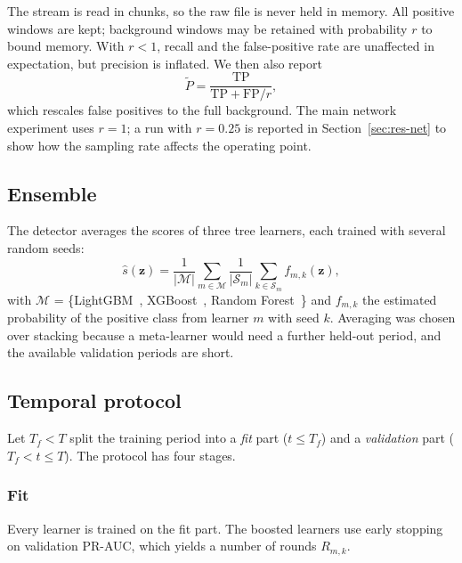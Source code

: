 The stream is read in chunks, so the raw file is never held in memory. All positive windows are kept; background windows may be retained with probability $r$ to bound memory. With $r < 1$, recall and the false-positive rate are unaffected in expectation, but precision is inflated. We then also report
\begin{equation}\label{eq:padj}
\tilde{P} = \frac{\mathrm{TP}}{\mathrm{TP} + \mathrm{FP}/r} ,
\end{equation}
which rescales false positives to the full background. The main network experiment uses $r = 1$; a run with $r = 0.25$ is reported in Section~\ref{sec:res-net} to show how the sampling rate affects the operating point.

\subsection{Ensemble}\label{sec:method-ens}
The detector averages the scores of three tree learners, each trained with several random seeds:
\begin{equation}\label{eq:ens}
\hat{s}(\mathbf{z}) = \frac{1}{|\mathcal{M}|} \sum_{m \in \mathcal{M}} \frac{1}{|\mathcal{S}_m|} \sum_{k \in \mathcal{S}_m} f_{m,k}(\mathbf{z}),
\end{equation}
with $\mathcal{M}$ = \{LightGBM~\cite{ke2017}, XGBoost~\cite{chen2016}, Random Forest~\cite{breiman2001}\} and $f_{m,k}$ the estimated probability of the positive class from learner $m$ with seed $k$. Averaging was chosen over stacking because a meta-learner would need a further held-out period, and the available validation periods are short.

\subsection{Temporal protocol}\label{sec:method-protocol}
Let $T_f < T$ split the training period into a \emph{fit} part ($t \le T_f$) and a \emph{validation} part ($T_f < t \le T$). The protocol has four stages.

\subsubsection{Fit} Every learner is trained on the fit part. The boosted learners use early stopping on validation PR-AUC, which yields a number of rounds $R_{m,k}$.


